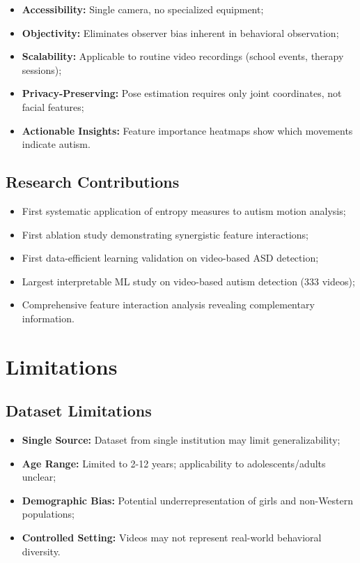 \documentclass[conference]{IEEEtran}
\begin{document}
\begin{itemize}
\item \textbf{Accessibility:} Single camera, no specialized equipment;
\item \textbf{Objectivity:} Eliminates observer bias inherent in behavioral observation;
\item \textbf{Scalability:} Applicable to routine video recordings (school events, therapy sessions);
\item \textbf{Privacy-Preserving:} Pose estimation requires only joint coordinates, not facial features;
\item \textbf{Actionable Insights:} Feature importance heatmaps show which movements indicate autism.
\end{itemize}

\subsection{Research Contributions}

\begin{itemize}
\item First systematic application of entropy measures to autism motion analysis;
\item First ablation study demonstrating synergistic feature interactions;
\item First data-efficient learning validation on video-based ASD detection;
\item Largest interpretable ML study on video-based autism detection (333 videos);
\item Comprehensive feature interaction analysis revealing complementary information.
\end{itemize}

\section{Limitations}

\subsection{Dataset Limitations}

\begin{itemize}
\item \textbf{Single Source:} Dataset from single institution may limit generalizability;
\item \textbf{Age Range:} Limited to 2-12 years; applicability to adolescents/adults unclear;
\item \textbf{Demographic Bias:} Potential underrepresentation of girls and non-Western populations;
\item \textbf{Controlled Setting:} Videos may not represent real-world behavioral diversity.
\end{itemize}
\end{document}
